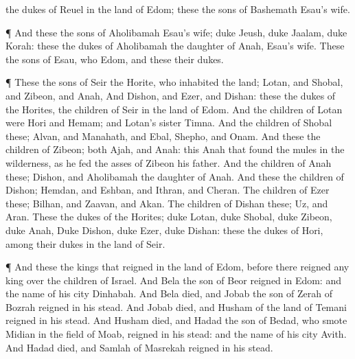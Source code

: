 {{} the
dukes
{} of
Reuel in the
land of
Edom; these
{} the
sons of
Bashemath
Esau’s
wife.
\par }{\PP {}¶ And these
{} the
sons of
Aholibamah
Esau’s
wife;
duke
Jeush,
duke
Jaalam,
duke
Korah: these
{} the
dukes
{} of
Aholibamah the
daughter of
Anah,
Esau’s
wife.
These
{} the
sons of
Esau, who
{}
Edom, and these
{} their
dukes.
\par }{\PP {}¶ These
{} the
sons of
Seir the
Horite, who
inhabited the
land;
Lotan, and
Shobal, and
Zibeon, and
Anah,
And
Dishon, and
Ezer, and
Dishan: these
{} the
dukes of the
Horites, the
children of
Seir in the
land of
Edom.
And the
children of
Lotan were
Hori and
Hemam; and
Lotan’s
sister
{}
Timna.
And the
children of
Shobal
{} these;
Alvan, and
Manahath, and
Ebal,
Shepho, and
Onam.
And these
{} the
children of
Zibeon; both
Ajah, and
Anah: this
{}
Anah that
found the
mules in the
wilderness, as he
fed the
asses of
Zibeon his
father.
And the
children of
Anah
{} these;
Dishon, and
Aholibamah the
daughter of
Anah.
And these
{} the
children of
Dishon;
Hemdan, and
Eshban, and
Ithran, and
Cheran.
The
children of
Ezer
{} these;
Bilhan, and
Zaavan, and
Akan.
The
children of
Dishan
{} these;
Uz, and
Aran.
These
{} the
dukes
{} of the
Horites;
duke
Lotan,
duke
Shobal,
duke
Zibeon,
duke
Anah,
Duke
Dishon,
duke
Ezer,
duke
Dishan: these
{} the
dukes
{} of
Hori, among their
dukes in the
land of
Seir.
\par }{\PP {}¶ And these
{} the
kings that
reigned in the
land of
Edom,
before there
reigned any
king over the
children of
Israel.
And
Bela the
son of
Beor
reigned in
Edom: and the
name of his
city
{}
Dinhabah.
And
Bela
died, and
Jobab the
son of
Zerah of
Bozrah
reigned in his stead.
And
Jobab
died, and
Husham of the
land of
Temani
reigned in his stead.
And
Husham
died, and
Hadad the
son of
Bedad, who
smote
Midian in the
field of
Moab,
reigned in his stead: and the
name of his
city
{}
Avith.
And
Hadad
died, and
Samlah of
Masrekah
reigned in his stead.
}
